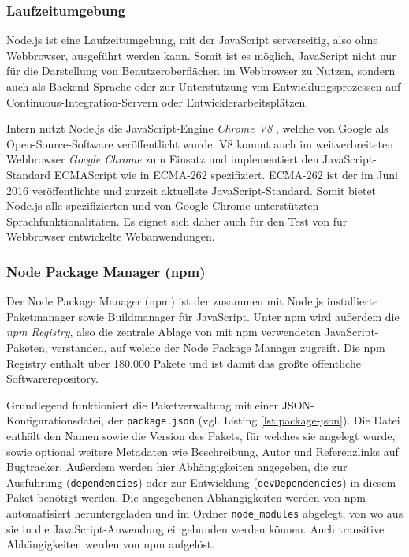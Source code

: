 \subsubsection{Laufzeitumgebung}
Node.js ist eine Laufzeitumgebung, mit der JavaScript serverseitig, also ohne Webbrowser, ausgeführt werden kann\cite[][1]{hughes2012einfuehrungnodejs}. Somit ist es möglich, JavaScript nicht nur für die Darstellung von Benutzeroberflächen im Webbrowser zu Nutzen, sondern auch als Backend-Sprache oder zur Unterstützung von Entwicklungsprozessen auf Continuous-Integration-Servern oder Entwicklerarbeitsplätzen.

Intern nutzt Node.js die JavaScript-Engine \textit{Chrome V8} \cite{nodejs}, welche von Google als Open-Source-Software veröffentlicht wurde. V8 kommt auch im weitverbreiteten Webbrowser \textit{Google Chrome} zum Einsatz und implementiert den JavaScript-Standard ECMAScript wie in ECMA-262 spezifiziert\cite{chromev8}. ECMA-262 ist der im Juni 2016 veröffentlichte und zurzeit aktuellste JavaScript-Standard\cite{ecma262}. Somit bietet Node.js alle spezifizierten und von Google Chrome unterstützten Sprachfunktionalitäten. Es eignet sich daher auch für den Test von für Webbrowser entwickelte Webanwendungen.

\subsubsection{Node Package Manager (npm)}
Der Node Package Manager (npm) ist der zusammen mit Node.js installierte Paketmanager sowie Buildmanager für JavaScript. Unter npm wird außerdem die \textit{npm Registry}, also die zentrale Ablage von mit npm verwendeten JavaScript-Paketen, verstanden, auf welche der Node Package Manager zugreift. \cite{npm-about} Die npm Registry enthält über 180.000 Pakete und ist damit das größte öffentliche Softwarerepository\cite{modulecount}.

Grundlegend funktioniert die Paketverwaltung mit einer JSON-Konfigurationsdatei, der \texttt{package.json} (vgl. Listing \ref{lst:package-json}). Die Datei enthält den Namen sowie die Version des Pakets, für welches sie angelegt wurde, sowie optional weitere Metadaten wie Beschreibung, Autor und Referenzlinks auf Bugtracker. Außerdem werden hier Abhängigkeiten angegeben, die zur Ausführung (\texttt{dependencies}) oder zur Entwicklung (\texttt{devDependencies}) in diesem Paket benötigt werden.\cite{npm-packagejson} Die angegebenen Abhängigkeiten werden von npm automatisiert heruntergeladen und im Ordner \texttt{node\_modules} abgelegt, von wo aus sie in die JavaScript-Anwendung eingebunden werden können. Auch transitive Abhängigkeiten werden von npm aufgelöst.\cite{npm-install}


